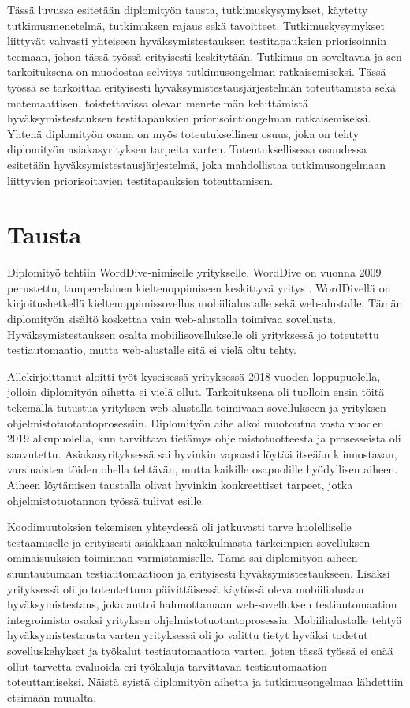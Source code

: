 Tässä luvussa esitetään diplomityön tausta, tutkimuskysymykset, käytetty tutkimusmenetelmä, tutkimuksen rajaus sekä tavoitteet.
Tutkimuskysymykset liittyvät vahvasti yhteiseen hyväksymistestauksen testitapauksien priorisoinnin teemaan, johon tässä työssä erityisesti keskitytään.
Tutkimus on soveltavaa ja sen tarkoituksena on muodostaa selvitys tutkimusongelman ratkaisemiseksi.
Tässä työssä se tarkoittaa erityisesti hyväksymistestausjärjestelmän toteuttamista sekä matemaattisen, toistettavissa olevan menetelmän kehittämistä hyväksymistestauksen testitapauksien priorisointiongelman ratkaisemiseksi.
Yhtenä diplomityön osana on myös toteutuksellinen osuus, joka on tehty diplomityön asiakasyrityksen tarpeita varten.
Toteutuksellisessa osuudessa esitetään hyväksymistestausjärjestelmä, joka mahdollistaa tutkimusongelmaan liittyvien priorisoitavien testitapauksien toteuttamisen.

\section{Tausta} \label{ch:06_tausta}

  Diplomityö tehtiin WordDive-nimiselle yritykselle. WordDive on vuonna 2009 perustettu, tamperelainen kieltenoppimiseen keskittyvä yritys \parencite{worddive_details}.
  WordDivellä on kirjoitushetkellä kieltenoppimissovellus mobiilialustalle sekä web-alustalle.
  Tämän diplomityön sisältö koskettaa vain web-alustalla toimivaa sovellusta.
  Hyväksymistestauksen osalta mobiilisovellukselle oli yrityksessä jo toteutettu testiautomaatio, mutta web-alustalle sitä ei vielä oltu tehty.

  Allekirjoittanut aloitti työt kyseisessä yrityksessä 2018 vuoden loppupuolella, jolloin diplomityön aihetta ei vielä ollut.
  Tarkoituksena oli tuolloin ensin töitä tekemällä tutustua yrityksen web-alustalla toimivaan sovellukseen ja yrityksen ohjelmistotuotantoprosessiin.
  Diplomityön aihe alkoi muotoutua vasta vuoden 2019 alkupuolella, kun tarvittava tietämys ohjelmistotuotteesta ja prosesseista oli saavutettu.
  Asiakasyrityksessä sai hyvinkin vapaasti löytää itseään kiinnostavan, varsinaisten töiden ohella tehtävän, mutta kaikille osapuolille hyödyllisen aiheen.
  Aiheen löytämisen taustalla olivat hyvinkin konkreettiset tarpeet, jotka ohjelmistotuotannon työssä tulivat esille.

  Koodimuutoksien tekemisen yhteydessä oli jatkuvasti tarve huolelliselle testaamiselle ja erityisesti asiakkaan näkökulmasta tärkeimpien sovelluksen ominaisuuksien toiminnan varmistamiselle.
  Tämä sai diplomityön aiheen suuntautumaan testiautomaatioon ja erityisesti hyväksymistestaukseen.
  Lisäksi yrityksessä oli jo toteutettuna päivittäisessä käytössä oleva mobiilialustan hyväksymistestaus, joka auttoi hahmottamaan web-sovelluksen testiautomaation integroimista osaksi yrityksen ohjelmistotuotantoprosessia.
  Mobiilialustalle tehtyä hyväksymistestausta varten yrityksessä oli jo valittu tietyt hyväksi todetut sovelluskehykset ja työkalut testiautomaatiota varten, joten tässä työssä ei enää ollut tarvetta evaluoida eri työkaluja tarvittavan testiautomaation toteuttamiseksi.
  Näistä syistä diplomityön aihetta ja tutkimusongelmaa lähdettiin etsimään muualta.

